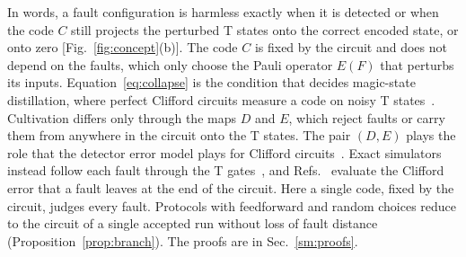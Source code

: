 \documentclass[aps,prl,reprint,twocolumn,amsmath,amssymb,floatfix,nofootinbib,superscriptaddress]{revtex4-2}
\theoremstyle{definition}
\theoremstyle{remark}
\begin{document}
In words, a fault configuration is harmless exactly when it is detected or when the code $C$ still projects the perturbed T states onto the correct encoded state, or onto zero [Fig.~\ref{fig:concept}(b)]. The code $C$ is fixed by the circuit and does not depend on the faults, which only choose the Pauli operator $E(F)$ that perturbs its inputs. Equation~\eqref{eq:collapse} is the condition that decides magic-state distillation, where perfect Clifford circuits measure a code on noisy T states~\cite{distillationpaper}. Cultivation differs only through the maps $D$ and $E$, which reject faults or carry them from anywhere in the circuit onto the T states. The pair $(D,E)$ plays the role that the detector error model plays for Clifford circuits~\cite{stim}. Exact simulators instead follow each fault through the T gates~\cite{soft,takada,merlin,magna,wanzapirain}, and Refs.~\cite{surti,chan} evaluate the Clifford error that a fault leaves at the end of the circuit. Here a single code, fixed by the circuit, judges every fault. Protocols with feedforward and random choices reduce to the circuit of a single accepted run without loss of fault distance (Proposition~\ref{prop:branch}). The proofs are in Sec.~\ref{sm:proofs}.
\end{document}
